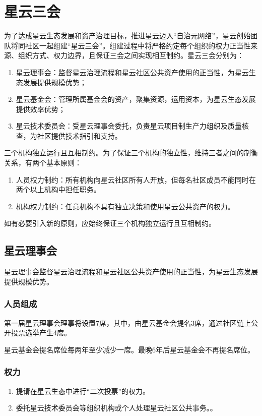 \section{星云三会}
为了达成星云生态发展和资产治理目标，推进星云迈入“自治元网络”，星云创始团队将同社区一起组建“星云三会”。组建过程中将严格约定每个组织的权力正当性来源、组织方式、权力边界，且保证三会之间实现相互制约。星云三会分别为：
\begin{enumerate}
	\item 星云理事会：监督星云治理流程和星云社区公共资产使用的正当性，为星云生态发展提供规模优势；
	\item 星云基金会：管理所属基金会的资产，聚集资源，运用资本，为星云生态发展提供效率优势；
	\item 星云技术委员会：受星云理事会委托，负责星云项目制生产力组织及质量核查，为社区提供技术指引和支持。
\end{enumerate}
三个机构独立运行且互相制约。为了保证三个机构的独立性，维持三者之间的制衡关系，有两个基本原则：
\begin{enumerate}
	\item 人员权力制约：所有机构向星云社区所有人开放，但每名社区成员不能同时在两个以上机构中担任职务。
	\item 机构权力制约：任意机构不具有独立决策和使用星云公共资产的权力。
\end{enumerate}
如有必要引入新的原则，应始终保证三个机构独立运行且互相制约。

\subsection{星云理事会}
星云理事会监督星云治理流程和星云社区公共资产使用的正当性，为星云生态发展提供规模优势。

\subsubsection{人员组成}

第一届星云理事会理事将设置7席，其中，由星云基金会提名3席，通过社区链上公开投票选举产生4席。

星云基金会提名席位每两年至少减少一席。最晚6年后星云基金会不再提名席位。

\subsubsection{权力}
\begin{enumerate}
	\item 提请在星云生态中进行“二次投票”的权力。
	\item 委托星云技术委员会等组织机构或个人处理星云社区公共事务。。
\end{enumerate}

